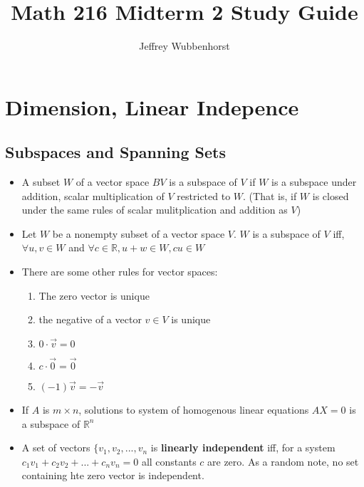 \documentclass[10pt,letterpaper]{article}
\author{Jeffrey Wubbenhorst}
\title{Math 216 Midterm 2 Study Guide }
\begin{document}
\maketitle

\section*{Dimension, Linear Indepence} 
\subsection*{Subspaces and Spanning Sets }%
\begin{itemize}

\item A subset $W$ of a vector space $BV$ is a subspace of $V$ if $W$ is a subspace under addition, scalar multiplication of $V$ restricted to  $W$. (That is, if $W$ is closed under the same rules of scalar mulitplication and addition as $V$)

\item Let $W$ be a nonempty subset of a vector space $V$. $W$ is a subspace of $V$ iff, $\forall u, v \in W$ and $\forall c \in \mathbb{R}, u + w \in W, cu \in W$

\item There are some other rules for vector spaces: 
\begin{enumerate}
\item The zero vector is unique 
\item the negative of a vector $v\in V$ is unique 
\item $0\cdot \vec{v}=0$
\item $c\cdot \vec{0}=\vec{0}$
\item $(-1)\vec{v}=-\vec{v}$ 
\end{enumerate}
	

\item If $A$ is $m\times n$, solutions to system of homogenous linear equations $AX=0$ is a subspace of $\mathbb{R}^n$

\item A set of vectors $\{v_1, v_2, ..., v_n$ is \textbf{linearly independent }iff, for a system $c_1v_1+c_2v_2+...+c_nv_n=0$ all constants $c$ are zero. As a random note, no set containing hte zero vector is independent. 

\end{itemize}	
\end{document}
